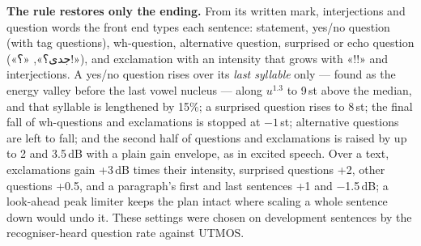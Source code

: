 \documentclass[conference]{IEEEtran}
\newcommand{\fa}[1]{{\persianfont\beginR #1\endR}}
\begin{document}
\textbf{The rule restores only the ending.} From its written mark, interjections and question words the front
end types each sentence: statement, yes/no question (with tag questions), wh-question, alternative question,
surprised or echo question (\fa{«جدی؟»}, \fa{«؟!»}), and exclamation with an intensity that grows with
\fa{«!!»} and interjections. A yes/no question rises over its \emph{last syllable} only --- found as the energy
valley before the last vowel nucleus --- along $u^{1.3}$ to 9\,st above the median, and that syllable is
lengthened by 15\%; a surprised question rises to 8\,st; the final fall of wh-questions and exclamations is
stopped at $-1$\,st; alternative questions are left to fall; and the second half of questions and
exclamations is raised by up to 2 and 3.5\,dB with a plain gain envelope, as in excited speech. Over a text,
exclamations gain +3\,dB times their intensity, surprised questions +2, other questions +0.5, and a
paragraph's first and last sentences +1 and $-$1.5\,dB; a look-ahead peak limiter keeps the plan intact where
scaling a whole sentence down would undo it. These settings were chosen on development sentences by the
recogniser-heard question rate against UTMOS.
\end{document}

